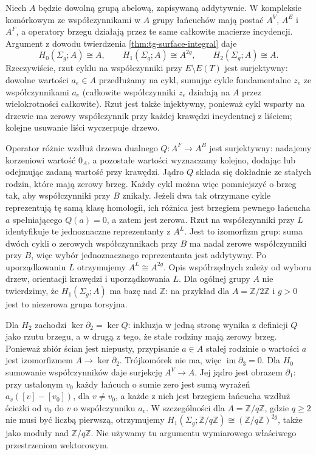 \begin{uwaga}
\label{rem:tg-surface-mod-q}
Niech $A$ będzie dowolną grupą abelową, zapisywaną addytywnie.
W kompleksie komórkowym ze współczynnikami w $A$ grupy łańcuchów
mają postać $A^V$, $A^E$ i $A^F$, a operatory brzegu
działają przez te same całkowite macierze incydencji.
Argument z dowodu twierdzenia \ref{thm:tg-surface-integral}
daje
\[
H_0(\Sigma_g;A)\cong A,\qquad
H_1(\Sigma_g;A)\cong A^{2g},\qquad
H_2(\Sigma_g;A)\cong A.
\]
Rzeczywiście, rzut cyklu na współczynniki przy
$E\setminus E(T)$ jest surjektywny: dowolne wartości
$a_e\in A$ przedłużamy na cykl, sumując cykle fundamentalne
$z_e$ ze współczynnikami $a_e$ (całkowite współczynniki
$z_e$ działają na $A$ przez wielokrotności całkowite).
Rzut jest także injektywny, ponieważ cykl wsparty na drzewie
ma zerowy współczynnik przy każdej krawędzi incydentnej
z liściem; kolejne usuwanie liści wyczerpuje drzewo.

Operator różnic wzdłuż drzewa dualnego $Q:A^F\to A^B$
jest surjektywny: nadajemy korzeniowi wartość $0_A$,
a pozostałe wartości wyznaczamy kolejno, dodając lub
odejmując zadaną wartość przy krawędzi.
Jądro $Q$ składa się dokładnie ze stałych rodzin, które
mają zerowy brzeg. Każdy cykl można więc pomniejszyć
o brzeg tak, aby współczynniki przy $B$ znikały.
Jeżeli dwa tak otrzymane cykle reprezentują tę samą
klasę homologii, ich różnica jest brzegiem pewnego
łańcucha $a$ spełniającego $Q(a)=0$, a zatem jest zerowa.
Rzut na współczynniki przy $L$ identyfikuje te jednoznaczne
reprezentanty z $A^L$. Jest to izomorfizm grup:
suma dwóch cykli o zerowych współczynnikach przy $B$
ma nadal zerowe współczynniki przy $B$, więc wybór
jednoznacznego reprezentanta jest addytywny.
Po uporządkowaniu $L$ otrzymujemy $A^L\cong A^{2g}$.
Opis współrzędnych zależy od wyboru drzew, orientacji
krawędzi i uporządkowania $L$. Dla ogólnej grupy $A$
nie twierdzimy, że $H_1(\Sigma_g;A)$ ma bazę nad
$\mathbb Z$: na przykład dla $A=\mathbb Z/2\mathbb Z$
i $g>0$ jest to niezerowa grupa torsyjna.

Dla $H_2$ zachodzi $\ker\partial_2=\ker Q$:
inkluzja w jedną stronę wynika z definicji $Q$
jako rzutu brzegu, a w drugą z tego, że stałe
rodziny mają zerowy brzeg.
Ponieważ zbiór ścian jest niepusty, przypisanie
$a\in A$ stałej rodzinie o wartości $a$ jest
izomorfizmem $A\to\ker\partial_2$.
Trójkomórek nie ma, więc $\operatorname{im}\partial_3=0$.
Dla $H_0$ sumowanie współczynników daje surjekcję
$A^V\to A$. Jej jądro jest obrazem $\partial_1$:
przy ustalonym $v_0$ każdy łańcuch o sumie zero
jest sumą wyrażeń $a_v([v]-[v_0])$, dla $v\ne v_0$,
a każde z nich jest brzegiem łańcucha wzdłuż ścieżki
od $v_0$ do $v$ o współczynniku $a_v$.
W szczególności dla $A=\mathbb Z/q\mathbb Z$, gdzie $q\ge2$
nie musi być liczbą pierwszą, otrzymujemy
$H_1(\Sigma_g;\mathbb Z/q\mathbb Z)\cong
(\mathbb Z/q\mathbb Z)^{2g}$, także jako moduły nad
$\mathbb Z/q\mathbb Z$. Nie używamy tu argumentu
wymiarowego właściwego przestrzeniom wektorowym.
\end{uwaga}

